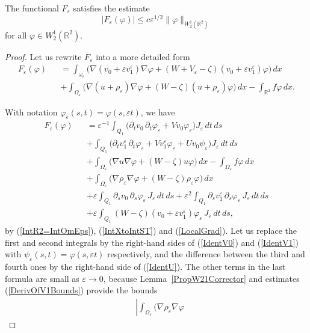 \documentclass[graybox]{svmult}
\newcommand{\Real}{\mathbb R}
\newcommand{\eps}{\varepsilon}
\renewcommand{\phi}{\varphi}
\renewcommand{\leq}{\leqslant}
\newcommand{\eqref}[1]{(\ref{#1})}
\begin{document}
\begin{lemma}
  The functional $F_\eps$ satisfies the estimate
$$
  |F_\eps(\phi)|\leq c\eps^{1/2}\|\phi\|_{W_2^1(\Real^2)}
$$
for all $\phi\in W_2^1(\Real^2)$.
\end{lemma}
\begin{proof}
Let us rewrite $F_\eps$ into a more detailed form
\begin{eqnarray}\nonumber
F_\eps(\phi)&&=
\int_{\omega_\eps}\Big(\nabla(v_0+\eps v_1^\eps)\nabla \phi+(W+V_\eps-\zeta)(v_0+\eps v_1^\eps) \phi\Big)\,dx
\\\nonumber
      &&+
\int_{\Omega_\eps}\Big(\nabla(u+\rho_\eps)\nabla \phi
            + (W-\zeta)(u+\rho_\eps) \phi\Big)\,dx
            -\int_{\Real^2}f\phi\,dx.
\end{eqnarray}


With notation $\phi_\eps(s,t)=\phi(s,\eps t)$, we have
\begin{eqnarray}\nonumber
F_\eps(\phi)&&=\eps^{-1}\int_{Q_1}\big(\partial_t v_0 \,\partial_t \phi_\eps
+Vv_0 \phi_\eps\big)J_\eps\,dt\, ds\\\nonumber
&&
+\int_{Q_1}\big(\partial_t v_1^\eps \,\partial_t \phi_\eps
+Vv_1^\eps \phi_\eps+Uv_0\psi_\eps\big)J_\eps\,dt\, ds
\\\nonumber
&&+\int_{\Omega_\eps}\big(\nabla u \nabla \phi+(W-\zeta)u\phi \big)\,dx-\int_{\Omega_\eps}f\phi\,dx
\\\nonumber
&&
+\int_{\Omega_\eps}\big(\nabla\rho_\eps\nabla \phi
+(W-\zeta)\rho_\eps \phi\big)\,dx\\\nonumber
&&
+\eps\int_{Q_1}\partial_s v_0 \,\partial_s \phi_\eps\,J_\eps\,dt\, ds
+\eps^2\int_{Q_1}\partial_s v_1^\eps \,\partial_s \phi_\eps\,J_\eps\,dt\, ds\\\nonumber
&&
+\eps \int_{Q_1}(W-\zeta)(v_0+\eps v_1^\eps)\phi_\eps\,J_\eps\,dt\, ds,
\end{eqnarray}
by \eqref{IntR2=IntOmEps}, \eqref{IntXtoIntST} and \eqref{LocalGrad}.
Let us replace the first and second integrals by the right-hand sides of \eqref{IdentV0} and \eqref{IdentV1} with $\psi_\eps(s,t)=\phi(s,\eps t)$ respectively, and the difference between  the third and fourth ones by the right-hand side of \eqref{IdentU}. The other terms in the last formula are small as $\eps\to 0$, because
Lemma~\ref{PropW21Corrector} and estimates \eqref{DerivOfV1Bounds} provide the bounds
\begin{eqnarray}\nonumber
&
\left|\int_{\Omega_\eps}\big(\nabla\rho_\eps\nabla \phi

\end{eqnarray}
\end{proof}
\end{document}
